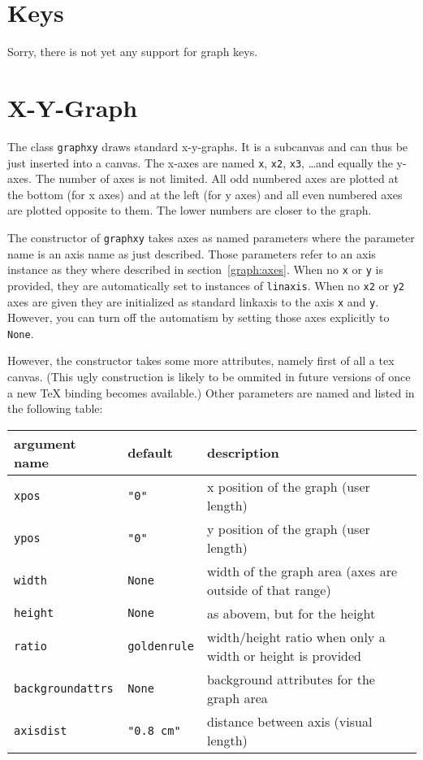 \section{Keys}
Sorry, there is not yet any support for graph keys.

\section{X-Y-Graph}

The class \verb|graphxy| draws standard x-y-graphs. It is a subcanvas
and can thus be just inserted into a canvas. The x-axes are named
\verb|x|, \verb|x2|, \verb|x3|, \dots and equally the y-axes. The
number of axes is not limited. All odd numbered axes are plotted at
the bottom (for x axes) and at the left (for y axes) and all even
numbered axes are plotted opposite to them. The lower numbers are
closer to the graph.

The constructor of \verb|graphxy| takes axes as named parameters where
the parameter name is an axis name as just described. Those parameters
refer to an axis instance as they where described in
section~\ref{graph:axes}. When no \verb|x| or \verb|y| is provided,
they are automatically set to instances of \verb|linaxis|. When no
\verb|x2| or \verb|y2| axes are given they are initialized as standard
linkaxis to the axis \verb|x| and \verb|y|. However, you can turn off
the automatism by setting those axes explicitly to \verb|None|.

However, the constructor takes some more attributes, namely first of
all a tex canvas. (This ugly construction is likely to be ommited in
future versions of \PyX{} once a new \TeX{} binding becomes
available.) Other parameters are named and listed in the following
table:

\medskip
\begin{tabularx}{\linewidth}{ll>{\raggedright\arraybackslash}X}
argument name&default&description\\
\hline
\texttt{xpos}&\texttt{"0"}&x position of the graph (user length)\\
\texttt{ypos}&\texttt{"0"}&y position of the graph (user length)\\
\texttt{width}&\texttt{None}&width of the graph area (axes are outside of that range)\\
\texttt{height}&\texttt{None}&as abovem, but for the height\\
\texttt{ratio}&\texttt{goldenrule}&width/height ratio when only a width or height is provided\\
\texttt{backgroundattrs}&\texttt{None}&background attributes for the graph area\\
\texttt{axisdist}&\texttt{"0.8 cm"}&distance between axis (visual length)\\
\end{tabularx}
\medskip

